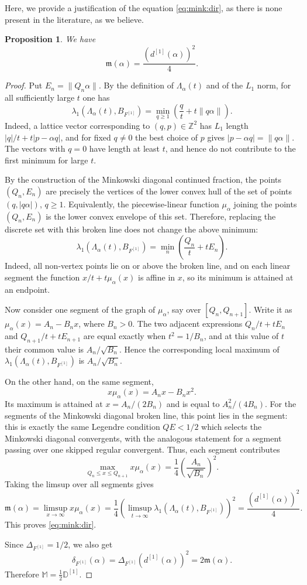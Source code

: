 \documentclass[11pt]{amsart}
\newtheorem{proposition}[theorem]{Proposition}
\newcommand{\MS}{\mathbb M}
\begin{document}
Here,  we provide a justification of the equation \eqref{eq:mink:dir}, as there is none present in the literature, as we believe.
\begin{proposition}
We have 
$$
 \mathfrak m(\alpha)=\frac{(d^{[1]}(\alpha))^2}{4}.
$$
\end{proposition}
\begin{proof}
 Put $E_n=\|Q_n\alpha\|$. By the definition of $\Lambda_\alpha(t)$ and of the $L_1$ norm, for all sufficiently large $t$ one has
$$
\lambda_1(\Lambda_\alpha(t),B_{F^{[1]}})
=
\min_{q\geq 1}
\left(\frac{q}{t}+t\|q\alpha\|\right).
$$
Indeed, a lattice vector corresponding to $(q,p)\in\mathbb Z^2$ has $L_1$ length $|q|/t+t|p-\alpha q|$, and for fixed $q\neq 0$ the best choice of $p$ gives $|p-\alpha q|=\|q\alpha\|$. The vectors with $q=0$ have length at least $t$, and hence do not contribute to the first minimum for large $t$.

By the construction of the Minkowski diagonal continued fraction, the points $(Q_n,E_n)$ are precisely the vertices of the lower convex hull of the set of points $(q,|q\alpha|)$, $q\geq 1$. Equivalently, the piecewise-linear function $\mu_\alpha$ joining the points $(Q_n,E_n)$ is the lower convex envelope of this set. Therefore, replacing the discrete set with this broken line does not change the above minimum:
$$
\lambda_1(\Lambda_\alpha(t),B_{F^{[1]}})
=
\min_n
\left(\frac{Q_n}{t}+tE_n\right).
$$
Indeed, all non-vertex points lie on or above the broken line, and on each linear segment the function $x/t+t\mu_\alpha(x)$ is affine in $x$, so its minimum is attained at an endpoint.

Now consider one segment of the graph of $\mu_\alpha$, say over $[Q_n,Q_{n+1}]$. Write it as $\mu_\alpha(x)=A_n-B_nx$, where $B_n>0$. The two adjacent expressions $Q_n/t+tE_n$ and $Q_{n+1}/t+tE_{n+1}$ are equal exactly when $t^2=1/B_n$, and at this value of $t$ their common value is $A_n/\sqrt{B_n}$. Hence the corresponding local maximum of $\lambda_1(\Lambda_\alpha(t),B_{F^{[1]}})$ is $A_n/\sqrt{B_n}$.

On the other hand, on the same segment,
$$
x\mu_\alpha(x)=A_nx-B_nx^2.
$$
Its maximum is attained at $x=A_n/(2B_n)$ and is equal to $A_n^2/(4B_n)$. For the segments of the Minkowski diagonal broken line, this point lies in the segment: this is exactly the same Legendre condition $Q E<1/2$ which selects the Minkowski diagonal convergents, with the analogous statement for a segment passing over one skipped regular convergent. Thus, each segment contributes
$$
\max_{Q_n\leq x\leq Q_{n+1}}x\mu_\alpha(x)
=
\frac14
\left(\frac{A_n}{\sqrt{B_n}}\right)^2.
$$
Taking the limsup over all segments gives
$$
\mathfrak m(\alpha)
=
\limsup_{x\to\infty}x\mu_\alpha(x)
=
\frac14
\left(
\limsup_{t\to\infty}
\lambda_1(\Lambda_\alpha(t),B_{F^{[1]}})
\right)^2
=
\frac{(d^{[1]}(\alpha))^2}{4}.
$$
This proves \eqref{eq:mink:dir}.

Since $\Delta_{F^{[1]}}=1/2$, we also get
$$
\delta_{F^{[1]}}(\alpha)
=
\Delta_{F^{[1]}}(d^{[1]}(\alpha))^2
=
2\mathfrak m(\alpha).
$$
Therefore $\MS=\frac12\mathbb D^{[1]}$.


\end{proof}
\end{document}
